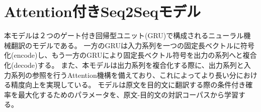 \documentclass[dvipdfmx,12pt,report]{jsbook}
\begin{document}













\chapter{Attention付きSeq2Seqモデル}

本モデルは２つのゲート付き回帰型ユニット(GRU)で構成されるニューラル機械翻訳のモデルである。
一方のGRUは入力系列を一つの固定長ベクトルに符号化(encode)し、もう一方のGRUにより固定長ベクトル符号を出力の系列へと複合化(decode)する。
また、本モデルは出力系列を複合化する際に、出力系列と入力系列の参照を行うAttention機構を備えており、これによってより長い分における精度向上を実現している。
モデルは原文を目的文に翻訳する際の条件付き確率を最大化するためのパラメータを、原文-目的文の対訳コーパスから学習する。
\end{document}
